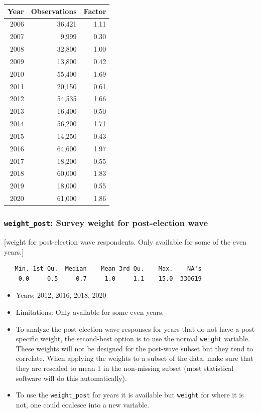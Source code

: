 \documentclass[10pt,article,oneside]{memoir}
\theoremstyle{definition}
\begin{document}
\begin{center}


\begin{tabular}{rrr}
\toprule
Year & Observations & Factor\\
\midrule
2006 & 36,421 & 1.11\\
2007 & 9,999 & 0.30\\
2008 & 32,800 & 1.00\\
2009 & 13,800 & 0.42\\
2010 & 55,400 & 1.69\\
2011 & 20,150 & 0.61\\
2012 & 54,535 & 1.66\\
2013 & 16,400 & 0.50\\
2014 & 56,200 & 1.71\\
2015 & 14,250 & 0.43\\
2016 & 64,600 & 1.97\\
2017 & 18,200 & 0.55\\
2018 & 60,000 & 1.83\\
2019 & 18,000 & 0.55\\
2020 & 61,000 & 1.86\\
\bottomrule
\end{tabular}
\end{center}

\hypertarget{weight_post-survey-weight-for-post-election-wave}{%
\subsubsection{\texorpdfstring{\texttt{weight\_post}: Survey weight for
post-election
wave}{weight\_post: Survey weight for post-election wave}}\label{weight_post-survey-weight-for-post-election-wave}}

{[}weight for post-election wave respondents. Only available for some of
the even years.{]}

\begin{verbatim}
   Min. 1st Qu.  Median    Mean 3rd Qu.    Max.    NA's 
    0.0     0.5     0.7     1.0     1.1    15.0  330619 
\end{verbatim}

\begin{itemize}
\tightlist
\item
  Years: 2012, 2016, 2018, 2020
\item
  Limitations: Only available for some even years.
\item
  To analyze the post-election wave responses for years that do not have
  a post-specific weight, the second-best option is to use the normal
  \texttt{weight} variable. These weights will not be designed for the
  post-wave subset but they tend to correlate. When applying the weights
  to a subset of the data, make sure that they are rescaled to mean 1 in
  the non-missing subset (most statistical software will do this
  automatically).
\item
  To use the \texttt{weight\_post} for years it is available but
  \texttt{weight} for where it is not, one could coalesce into a new
  variable.
\end{itemize}
\end{document}
